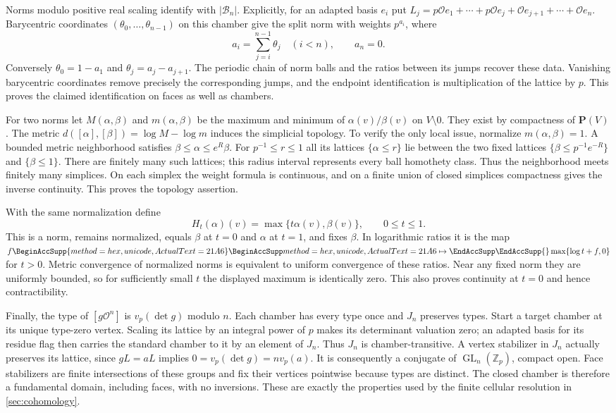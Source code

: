 \documentclass[11pt]{article}
\numberwithin{equation}{section}
\theoremstyle{definition}
\theoremstyle{remark}
\newcommand{\Z}{\mathbb Z}
\newcommand{\cO}{\mathcal O}
\DeclareMathOperator{\GL}{GL}
\let\UnicodeOriginalMapsto\mapsto
\DeclareRobustCommand{\mapsto}{
  \BeginAccSupp{method=hex,unicode,ActualText=21A6}
  \UnicodeOriginalMapsto\EndAccSupp{}}
\begin{document}
Norms modulo positive real scaling identify with $|\mathcal B_n|$.
Explicitly, for an adapted basis $e_i$ put
$L_j=p\cO e_1+\cdots+p\cO e_j+\cO e_{j+1}+\cdots+\cO e_n$.
Barycentric coordinates $(\theta_0,\ldots,\theta_{n-1})$ on this chamber
give the split norm with weights $p^{a_i}$, where
\[
 a_i=\sum_{j=i}^{n-1}\theta_j\quad(i<n),\qquad a_n=0.
\]
Conversely $\theta_0=1-a_1$ and $\theta_j=a_j-a_{j+1}$.
The periodic chain of norm balls and the ratios between its jumps recover
these data.  Vanishing barycentric coordinates remove precisely the
corresponding jumps, and the endpoint identification is multiplication
of the lattice by $p$.  This proves the claimed identification on faces
as well as chambers.

For two norms let $M(\alpha,\beta)$ and $m(\alpha,\beta)$ be the
maximum and minimum of $\alpha(v)/\beta(v)$ on $V\setminus0$.
They exist by compactness of $\mathbf P(V)$.  The metric
$d([\alpha],[\beta])=\log M-\log m$ induces the simplicial topology.
To verify the only local issue, normalize $m(\alpha,\beta)=1$.
A bounded metric neighborhood satisfies
$\beta\le\alpha\le e^R\beta$.  For $p^{-1}\le r\le1$ all its
lattices $\{\alpha\le r\}$ lie between the two fixed lattices
$\{\beta\le p^{-1}e^{-R}\}$ and $\{\beta\le1\}$.
There are finitely many such lattices; this radius interval represents
every ball homothety class.  Thus the neighborhood meets finitely many
simplices.  On each simplex the weight formula is continuous, and on
a finite union of closed simplices compactness gives the inverse
continuity.  This proves the topology assertion.

With the same normalization define
\[
 H_t(\alpha)(v)=\max\{t\alpha(v),\beta(v)\},\qquad 0\le t\le1.
\]
This is a norm, remains normalized, equals $\beta$ at $t=0$ and
$\alpha$ at $t=1$, and fixes $\beta$.  In logarithmic ratios it is the
map $f\mapsto\max\{\log t+f,0\}$ for $t>0$.
Metric convergence of normalized norms is equivalent to uniform
convergence of these ratios.  Near any fixed norm they are uniformly
bounded, so for sufficiently small $t$ the displayed maximum is
identically zero.  This also proves continuity at $t=0$ and hence
contractibility.

Finally, the type of $[g\cO^n]$ is $v_p(\det g)$ modulo $n$.
Each chamber has every type once and $J_n$ preserves types.
Start a target chamber at its unique type-zero vertex.  Scaling its
lattice by an integral power of $p$ makes its determinant valuation zero;
an adapted basis for its residue flag then carries the standard chamber
to it by an element of $J_n$.  Thus $J_n$ is chamber-transitive.
A vertex stabilizer in $J_n$ actually preserves its lattice, since
$gL=aL$ implies $0=v_p(\det g)=n v_p(a)$.  It is consequently a
conjugate of $\GL_n(\Z_p)$, compact open.  Face stabilizers are finite
intersections of these groups and fix their vertices pointwise because
types are distinct.  The closed chamber is therefore a fundamental
domain, including faces, with no inversions.  These are exactly the
properties used by the finite cellular resolution in \cref{sec:cohomology}.
\end{document}
